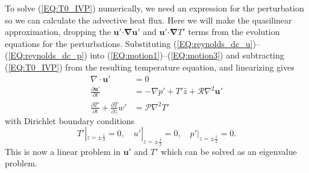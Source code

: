 \documentclass[reprint,amsmath,amssymb,aps]{revtex4-1}
\renewcommand{\vec}[1]{\boldsymbol{#1}}
\newcommand{\eq}[1]{(\ref{#1})}
\newcommand{\eqss}[2]{(\ref{#1})--(\ref{#2})}
\begin{document}
To solve \eq{EQ:T0_IVP} numerically, we need an expression for the perturbation so we can calculate the advective heat flux.
Here we will make the quasilinear approximation, dropping the $\vec{u}'\vec{\cdot}\vec{\nabla}\vec{u}'$ and $\vec{u}'\vec{\cdot}\vec{\nabla}T'$ terms from the evolution equations for the perturbations.
Substituting \eqss{EQ:reynolds_dc_u}{EQ:reynolds_dc_p} into \eqss{EQ:motion1}{EQ:motion3} and subtracting \eq{EQ:T0_IVP} from the resulting temperature equation, and linearizing gives
\begin{align}
    \nabla \cdot \mathbf{u'} &= 0 \label{EQ:linear1}\\
    \frac{\partial\mathbf{u'}}{\partial t} &= - \nabla p' + T'\hat{z} + \mathcal{R} \nabla^2 \mathbf{u'} \label{EQ:linear2}\\
    \frac{\partial T'}{\partial t} + \frac{\partial \bar{T}}{\partial z} w' &= \mathcal{P} \nabla^2 T' \label{EQ:linear3}
\end{align}
with Dirichlet boundary conditions 
\begin{equation}
    T'|_{z = \pm \frac{1}{2}} = 0, \quad u'|_{z = \pm \frac{1}{2}} = 0, \quad p'|_{z = \pm \frac{1}{2}} = 0.
\end{equation}
This is now a linear problem in $\vec{u}'$ and $T'$ which can be solved as an eigenvalue problem.
\end{document}
